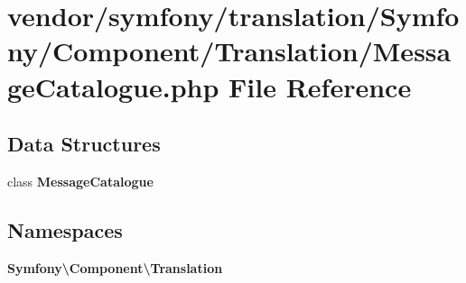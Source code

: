 \section{vendor/symfony/translation/\+Symfony/\+Component/\+Translation/\+Message\+Catalogue.php File Reference}
\label{_message_catalogue_8php}
\subsection*{Data Structures}
\begin{DoxyCompactItemize}
\item 
class {\bf Message\+Catalogue}
\end{DoxyCompactItemize}
\subsection*{Namespaces}
\begin{DoxyCompactItemize}
\item 
 {\bf Symfony\textbackslash{}\+Component\textbackslash{}\+Translation}
\end{DoxyCompactItemize}
